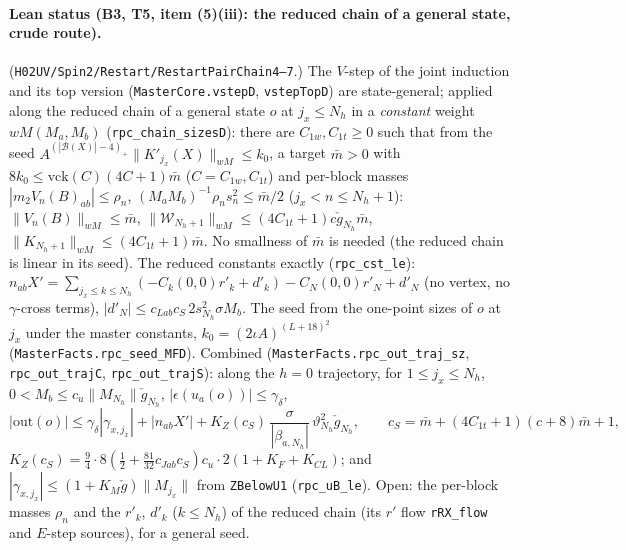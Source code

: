 \documentclass[11pt]{amsart}
\theoremstyle{definition}
\theoremstyle{remark}
\numberwithin{equation}{section}
\begin{document}
\paragraph{Lean status (B3, T5, item (5)(iii): the reduced chain of a general state, crude route).}
(\texttt{H02UV/Spin2/Restart/RestartPairChain4--7}.) The $V$-step of the joint induction and its top version
(\texttt{MasterCore.vstepD}, \texttt{vstepTopD}) are state-general; applied along the reduced chain of a general
state $o$ at $j_x\le N_h$ in a \emph{constant} weight $wM(M_a,M_b)$ (\texttt{rpc\_chain\_sizesD}): there are
$C_{1w},C_{1t}\ge0$ such that from the seed $A^{(|\mathcal B(X)|-4)_+}\|K'_{j_x}(X)\|_{wM}\le k_0$, a target
$\bar m>0$ with $8k_0\le\mathrm{vck}(C)(4C+1)\bar m$ ($C=C_{1w},C_{1t}$) and per-block masses
$|m_2V_n(B)_{ab}|\le\rho_n$, $(M_aM_b)^{-1}\rho_ns_n^2\le\bar m/2$ ($j_x<n\le N_h+1$): $\|V_n(B)\|_{wM}\le\bar m$,
$\|\mathcal W_{N_h+1}\|_{wM}\le(4C_{1t}+1)c\check g_{N_h}\bar m$, $\|K_{N_h+1}\|_{wM}\le(4C_{1t}+1)\bar m$. No smallness of
$\bar m$ is needed (the reduced chain is linear in its seed). The reduced constants exactly
(\texttt{rpc\_cst\_le}): $n_{ab}X'=\sum_{j_x\le k\le N_h}(-C_k(0,0)r'_k+d'_k)-C_N(0,0)r'_N+d'_N$ (no vertex, no
$\gamma$-cross terms), $|d'_N|\le c_{Lab}c_S\,2s_{N_h}^2\sigma M_b$. The seed from the one-point sizes of $o$ at $j_x$
under the master constants, $k_0=(2\iota A)^{(L+18)^2}$ (\texttt{MasterFacts.rpc\_seed\_MFD}). Combined
(\texttt{MasterFacts.rpc\_out\_traj\_sz}, \texttt{rpc\_out\_trajC}, \texttt{rpc\_out\_trajS}): along the $h=0$
trajectory, for $1\le j_x\le N_h$, $0<M_b\le c_u\|M_{N_h}\|\check g_{N_h}$, $|\epsilon(u_a(o))|\le\gamma_\delta$,
\[
|\mathrm{out}(o)|\le\gamma_\delta|\gamma_{x,j_x}|+|n_{ab}X'|+K_Z(c_S)\,\frac{\sigma}{|\beta_{a,N_h}|}\,
\vartheta_{N_h}^2\check g_{N_h},\qquad c_S=\bar m+(4C_{1t}+1)(c+8)\bar m+1,
\]
$K_Z(c_S)=\frac94\cdot8(\frac12+\frac{81}{32}c_{Jab}c_S)c_u\cdot2(1+K_F+K_{CL})$; and $|\gamma_{x,j_x}|\le(1+K_M\check g)
\|M_{j_x}\|$ from \texttt{ZBelowU1} (\texttt{rpc\_uB\_le}). Open: the per-block masses $\rho_n$ and the
$r'_k$, $d'_k$ ($k\le N_h$) of the reduced chain (its $r'$ flow \texttt{rRX\_flow} and $E$-step sources),
for a general seed.
\end{document}
